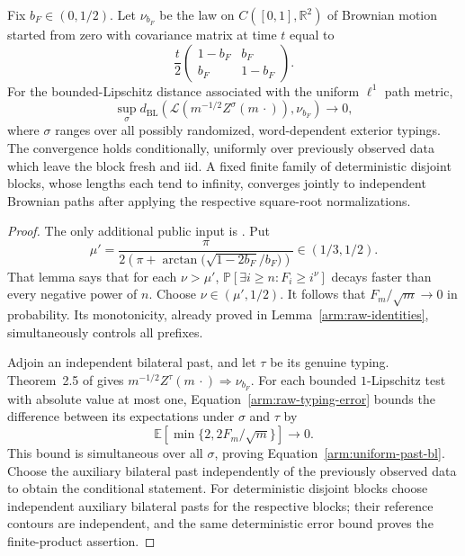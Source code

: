 \begin{proposition}
\label{arm:uniform-past-limit}
Fix $b_F\in(0,1/2)$.  Let $\nu_{b_F}$ be the law on
$C([0,1],\mathbb R^2)$ of Brownian motion started from zero with
covariance matrix at time $t$ equal to
\[
 \frac t2
 \begin{pmatrix}1-b_F&b_F\\b_F&1-b_F\end{pmatrix}.
\]
For the bounded-Lipschitz distance associated with the uniform
$\ell^1$ path metric,
\begin{equation}
\label{arm:uniform-past-bl}
 \sup_\sigma d_{\mathrm{BL}}\left(
   \mathcal L(m^{-1/2}Z^\sigma(m\,\cdot)),\nu_{b_F}\right)
   \longrightarrow0,
\end{equation}
where $\sigma$ ranges over all possibly randomized, word-dependent
exterior typings.  The convergence holds conditionally, uniformly
over previously observed data which leave the block fresh and iid.
A fixed finite family of deterministic disjoint blocks, whose lengths each
tend to infinity, converges jointly to independent Brownian paths after
applying the respective square-root normalizations.
\end{proposition}

\begin{proof}
The only additional public input is
\cite[Lemma~3.7, Equation~(3.15)]{GwynneMaoSunConeTimes}.
Put
\[
 \mu'=\frac{\pi}{2\left(\pi+
       \arctan\bigl(\sqrt{1-2b_F}/b_F\bigr)\right)}\in(1/3,1/2).
\]
That lemma says that for each $\nu>\mu'$,
$\mathbb P[\exists i\ge n:F_i\ge i^\nu]$ decays faster than every
negative power of $n$.  Choose $\nu\in(\mu',1/2)$.  It follows that
$F_m/\sqrt m\to0$ in probability.  Its monotonicity, already proved
in Lemma~\ref{arm:raw-identities}, simultaneously controls all prefixes.

Adjoin an independent bilateral past, and let $\tau$ be its genuine
typing.  Theorem~2.5 of \cite{SheffieldInventory} gives
$m^{-1/2}Z^\tau(m\,\cdot)\Rightarrow\nu_{b_F}$.
For each bounded $1$-Lipschitz test with absolute value at most one,
Equation~\eqref{arm:raw-typing-error} bounds the difference between
its expectations under $\sigma$ and $\tau$ by
\[
 \mathbb E\left[\min\{2,2F_m/\sqrt m\}\right]\longrightarrow0.
\]
This bound is simultaneous over all $\sigma$, proving
Equation~\eqref{arm:uniform-past-bl}.  Choose the auxiliary bilateral
past independently of the previously observed data to obtain the
conditional statement.  For deterministic disjoint blocks choose independent
auxiliary bilateral pasts for the respective blocks; their reference
contours are independent, and the same deterministic error bound
proves the finite-product assertion.
\end{proof}

